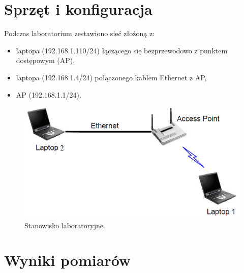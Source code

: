 \documentclass[12pt, a4paper, oneside]{article}
\begin{document}
\section{Sprzęt i konfiguracja}
\indent\indent Podczas laboratorium zestawiono sieć złożoną z:
\begin{itemize}
\item laptopa (192.168.1.110/24) łączącego się bezprzewodowo z punktem dostępowym (AP),
\item laptopa (192.168.1.4/24) połączonego kablem Ethernet z AP,
\item AP (192.168.1.1/24).
\end{itemize}
\begin{figure}[h!]
\centering
\includegraphics[scale=0.4]{pics/f1.png}
\caption{Stanowisko laboratoryjne.}
\end{figure}
\clearpage
\section{Wyniki pomiarów}
\end{document}
